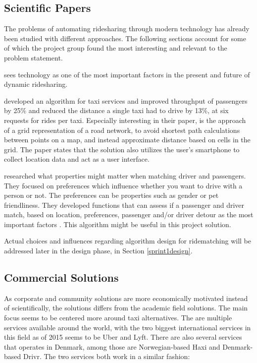 \subsection{Scientific Papers}
The problems of automating ridesharing through modern technology has already been studied with different approaches.
The following sections account for some of which the project group found the most interesting and relevant to the problem statement. 

\citet{doi:10.1080/01441647.2011.621557, amey2011real} sees technology as one of the most important factors in the present and future of dynamic ridesharing.

\citet{ShuoMa2013} developed an algorithm for taxi services and improved throughput of passengers by 25\% and reduced the distance a single taxi had to drive by 13\%, at six requests for rides per taxi.
Especially interesting in their paper, is the approach of a grid representation of a road network, to avoid shortest path calculations between points on a map, and instead approximate distance based on cells in the grid.
The paper states that the solution also utilizes the user's smartphone to collect location data and act as a user interface.

\citet{ghoseiri2011real} researched what properties might matter when matching driver and passengers.
They focused on preferences which influence whether you want to drive with a person or not.
The preferences can be properties such as gender or pet friendliness.
They developed functions that can assess if a passenger and driver match, based on location, preferences, passenger and/or driver detour as the most important factors \cite{ghoseiri2011real}.
This algorithm might be useful in this project solution.

Actual choices and influences regarding algorithm design for ridematching will be addressed later in the design phase, in Section \ref{sprint1design}.

\subsection{Commercial Solutions}
As corporate and community solutions are more economically motivated instead of scientifically, the solutions differs from the academic field solutions.
The main focus seems to be centered more around taxi alternatives.
The are multiple services available around the world, with the two biggest international services in this field as of 2015 seems to be Uber and Lyft\cite{ridehail}.
There are also several services that operates in Denmark, among those are Norwegian-based Haxi and Denmark-based Drivr.
The two services both work in a similar fashion: 

